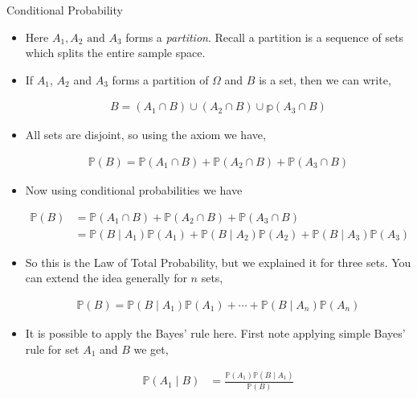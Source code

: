 \documentclass[8pt, usepdftitle = false]{beamer}
\begin{document}
\begin{frame}[allowframebreaks]{Conditional Probability}
\begin{itemize}
\item Here $A_1, A_2 \text{ and } A_3$ forms a  \emph{partition}. Recall a partition is a sequence of sets which splits the entire sample space.

\item If $A_1$, $A_2$ and $A_3$ forms a partition of $\Omega$ and $B$ is a set, then we can write,

\begin{align}
B=\left(A_1 \cap B\right) \cup \left(A_2 \cap B\right) \cup \mathbb{p}\left(A_3 \cap B\right)
\end{align}

\item All sets are disjoint, so using the axiom we have,

\begin{align*}
\mathbb{P}(B)=\mathbb{P}\left(A_1 \cap B\right)+ \mathbb{P}\left(A_2 \cap B\right) + \mathbb{P}\left(A_3 \cap B\right)
\end{align*}


\item Now using conditional probabilities we have


\begin{align*}
\mathbb{P}(B)&=\mathbb{P}\left(A_1 \cap B\right)+ \mathbb{P}\left(A_2 \cap B\right) + \mathbb{P}\left(A_3 \cap B\right) \\
&= \mathbb{P}\left(B \mid A_1\right)  \mathbb{P}\left(A_1\right)+  \mathbb{P}\left(B \mid A_2\right) \mathbb{P}\left(A_2\right) + \mathbb{P}\left(B \mid A_3\right) \mathbb{P}\left(A_3\right) 
\end{align*}


\item So this is the Law of Total Probability, but we explained it for three sets. You can extend the idea generally for $n$ sets,


\begin{align*}
\mathbb{P}(B) = \mathbb{P}(B \mid A_1) \mathbb{P}(A_1) + \cdots + \mathbb{P}(B \mid A_n) \mathbb{P}(A_n) 
\end{align*}




\framebreak

\item It is possible to apply the Bayes' rule here. First note applying simple Bayes' rule for set $A_1$ and $B$ we get,



\begin{align*}
\mathbb{P}\left(A_1 \mid B\right) &=\frac{\mathbb{P}\left(A_1\right) \mathbb{P}\left(B \mid A_1\right)}{\mathbb{P}(B)}
\end{align*}


\end{itemize}
\end{frame}
\end{document}
